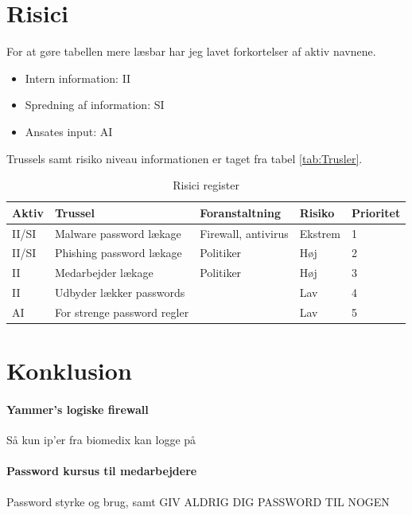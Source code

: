 \documentclass{article}
\begin{document}
\section{Risici}
For at gøre tabellen mere læsbar har jeg lavet forkortelser af aktiv navnene. 
\begin{itemize}
    \item{Intern information:} II
    \item{Spredning af information:} SI
    \item{Ansates input:} AI
\end{itemize}
Trussels samt risiko niveau informationen er taget fra tabel \ref{tab:Trusler}. 

\begin{table}[h!]
    \begin{center}
        \begin{tabularx}{\textwidth}{l|X|X|l|l}
            Aktiv    & Trussel                              & Foranstaltning      & Risiko & Prioritet \\  \hline 
            II/SI    & Malware password lækage              & Firewall, antivirus & Ekstrem& 1\\
            II/SI    & Phishing password lækage             & Politiker           & Høj    & 2\\ 
            II       & Medarbejder lækage                   & Politiker           & Høj    & 3\\
            II       & Udbyder lækker passwords             &                     & Lav    & 4\\
            AI       & For strenge password regler          &                     & Lav    & 5\\
        \end{tabularx}
    \end{center}
    \caption{Risici register}
    \label{tab:riskReg}
\end{table}

\section{Konklusion}

\paragraph{Yammer's logiske firewall}
Så kun ip'er fra biomedix kan logge på

\paragraph{Password kursus til medarbejdere}
Password styrke og brug, samt GIV ALDRIG DIG PASSWORD TIL NOGEN
\end{document}
